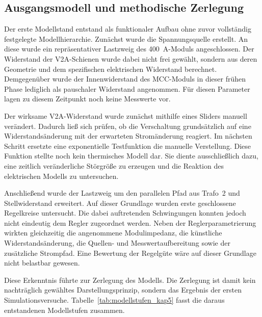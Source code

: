 
\subsection{Ausgangsmodell und methodische Zerlegung}
\label{sec:ausgangsmodell_zerlegung}

Der erste Modellstand entstand als funktionaler Aufbau ohne zuvor
vollständig festgelegte Modellhierarchie. Zunächst wurde die
Spannungsquelle erstellt. An diese wurde ein repräsentativer Lastzweig des
\SI{400}{\ampere}-Moduls angeschlossen. Der Widerstand der V2A-Schienen wurde
dabei nicht frei gewählt, sondern aus deren Geometrie und dem spezifischen
elektrischen Widerstand berechnet. Demgegenüber wurde der Innenwiderstand des
MCC-Moduls in dieser frühen Phase lediglich als pauschaler Widerstand
angenommen. Für diesen Parameter lagen zu diesem Zeitpunkt noch keine
Messwerte vor.

Der wirksame V2A-Widerstand wurde zunächst mithilfe eines Sliders manuell
verändert. Dadurch ließ sich prüfen, ob die Verschaltung grundsätzlich auf
eine Widerstandsänderung mit der erwarteten Stromänderung reagiert. Im
nächsten Schritt ersetzte eine exponentielle Testfunktion die manuelle
Verstellung. Diese Funktion stellte noch kein thermisches Modell dar. Sie
diente ausschließlich dazu, eine zeitlich veränderliche Störgröße zu
erzeugen und die Reaktion des elektrischen Modells zu untersuchen.

Anschließend wurde der Lastzweig um den parallelen Pfad aus Trafo~2 und
Stellwiderstand erweitert. Auf dieser Grundlage wurden erste geschlossene
Regelkreise untersucht. Die dabei auftretenden Schwingungen konnten jedoch
nicht eindeutig dem Regler zugeordnet werden. Neben der Reglerparametrierung
wirkten gleichzeitig die angenommene Modulimpedanz, die künstliche
Widerstandsänderung, die Quellen- und Messwertaufbereitung sowie der
zusätzliche Strompfad. Eine Bewertung der Regelgüte wäre auf dieser Grundlage
nicht belastbar gewesen.

Diese Erkenntnis führte zur Zerlegung des Modells. Die Zerlegung ist damit
kein nachträglich gewähltes Darstellungsprinzip, sondern das Ergebnis der
ersten Simulationsversuche. Tabelle~\ref{tab:modellstufen_kap5} fasst die
daraus entstandenen Modellstufen zusammen.

